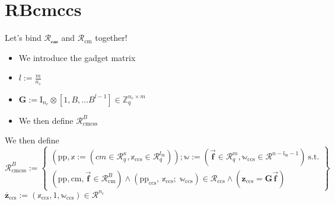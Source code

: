 \section{RBcmccs}
\begin{frame}
    {Let's bind $\mathcal{R_{\text{cm}}}$ and $\mathcal{R}_{\text{cm}}$ together!}
    \begin{itemize}
        \item We introduce the gadget matrix
        \item $l := \frac{m}{n_c} $
        \item $\textbf{G} := \text{I}_{n_{c}}\otimes [1, B, ... B^{l -1}] \in \mathbb{Z}^{n_{c} \times m}_q$
        \item We then define $\mathcal{R}^{B}_{\text{cmcss}}$
    \end{itemize}
    We then define \begin{equation*}
        \mathcal{R}^{B}_{\text{cmcss}} := \left\{ \begin{array}{l}
            (\text{pp}, \mathbb{x} := (cm  \in \mathcal{R}^{\kappa}_q , \mathbb{x}_{\text{ccs}} \in \mathcal{R}^{l_{\text{in}}}_q));
            \mathbb{w} := (\overrightarrow{\textbf{f}} \in \mathcal{R}^m_q, \mathbb{w}_{\text{ccs}} \in \mathcal{R}^{n- l_{\text{in}} -1}) \ \text{s.t.} \\
            (\text{pp}, \text{cm}, \overrightarrow{\textbf{f}} \in \mathcal{R}^B_{\text{cm}}) \land (\text{pp}_\text{ccs},\,\mathbb{x}_\text{ccs};\;\mathbb{w}_\text{ccs}) \in \mathcal{R}_{\text{ccs}}\land (\textbf{z}_{\text{ccs}} = \textbf{G}\overrightarrow{\textbf{f}})
        \end{array} \right\}
    \end{equation*}
    $\overline{\textbf{z}}_{\text{ccs}}:= (\mathbb{x}_{\text{ccs}}, 1,\mathbb{w}_{\text{ccs}}) \in \mathcal{R}^{n_c}$
\end{frame}